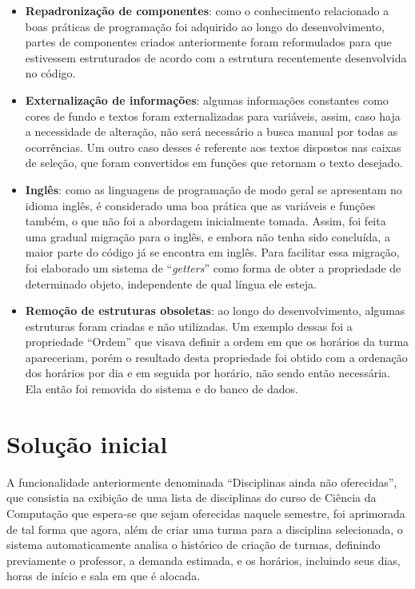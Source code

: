 \begin{itemize}
  \item \textbf{Repadronização de componentes}: como o conhecimento relacionado a boas práticas de programação foi adquirido ao longo do desenvolvimento, partes de componentes criados anteriormente foram reformulados para que estivessem estruturados de acordo com a estrutura recentemente desenvolvida no código.
  \item \textbf{Externalização de informações}: algumas informações constantes como cores de fundo e textos foram externalizadas para variáveis, assim, caso haja a necessidade de alteração, não será necessário a busca manual por todas as ocorrências. Um outro caso desses é referente aos textos dispostos nas caixas de seleção, que foram convertidos em funções que retornam o texto desejado.
  \item \textbf{Inglês}: como as linguagens de programação de modo geral se apresentam no idioma inglês, é considerado uma boa prática que as variáveis e funções também, o que não foi a abordagem inicialmente tomada. Assim, foi feita uma gradual migração para o inglês, e embora não tenha sido concluída, a maior parte do código já se encontra em inglês. Para facilitar essa migração, foi elaborado um sistema de ``\textit{getters}'' como forma de obter a propriedade de determinado objeto, independente de qual língua ele esteja.
  \item \textbf{Remoção de estruturas obsoletas}: ao longo do desenvolvimento, algumas estruturas foram criadas e não utilizadas. Um exemplo dessas foi a propriedade ``Ordem'' que visava definir a ordem em que os horários da turma apareceriam, porém o resultado desta propriedade foi obtido com a ordenação dos horários por dia e em seguida por horário, não sendo então necessária. Ela então foi removida do sistema e do banco de dados.
\end{itemize}

\section{Solução inicial} \label{sec:Solução inicial}

A funcionalidade anteriormente denominada ``Disciplinas ainda não oferecidas'', que consistia na exibição de uma lista de disciplinas do curso de Ciência da Computação que espera-se que sejam oferecidas naquele semestre, foi aprimorada de tal forma que agora, além de criar uma turma para a disciplina selecionada, o sistema automaticamente analisa o histórico de criação de turmas, definindo previamente o professor, a demanda estimada, e os horários, incluindo seus dias, horas de início e sala em que é alocada.

